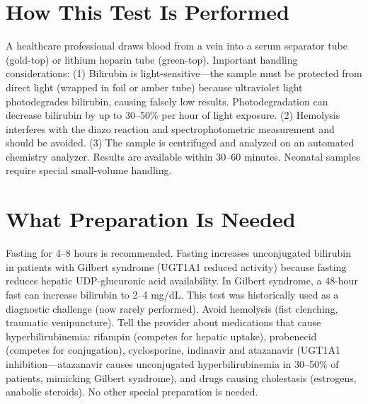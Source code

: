 \section*{How This Test Is Performed}
A healthcare professional draws blood from a vein into a serum separator tube (gold-top) or lithium heparin tube (green-top). Important handling considerations: (1) Bilirubin is light-sensitive---the sample must be protected from direct light (wrapped in foil or amber tube) because ultraviolet light photodegrades bilirubin, causing falsely low results. Photodegradation can decrease bilirubin by up to 30--50\% per hour of light exposure. (2) Hemolysis interferes with the diazo reaction and spectrophotometric measurement and should be avoided. (3) The sample is centrifuged and analyzed on an automated chemistry analyzer. Results are available within 30--60 minutes. Neonatal samples require special small-volume handling.

\section*{What Preparation Is Needed}
Fasting for 4--8 hours is recommended. Fasting increases unconjugated bilirubin in patients with Gilbert syndrome (UGT1A1 reduced activity) because fasting reduces hepatic UDP-glucuronic acid availability. In Gilbert syndrome, a 48-hour fast can increase bilirubin to 2--4 mg/dL. This test was historically used as a diagnostic challenge (now rarely performed). Avoid hemolysis (fist clenching, traumatic venipuncture). Tell the provider about medications that cause hyperbilirubinemia: rifampin (competes for hepatic uptake), probenecid (competes for conjugation), cyclosporine, indinavir and atazanavir (UGT1A1 inhibition---atazanavir causes unconjugated hyperbilirubinemia in 30--50\% of patients, mimicking Gilbert syndrome), and drugs causing cholestasis (estrogens, anabolic steroids). No other special preparation is needed.

